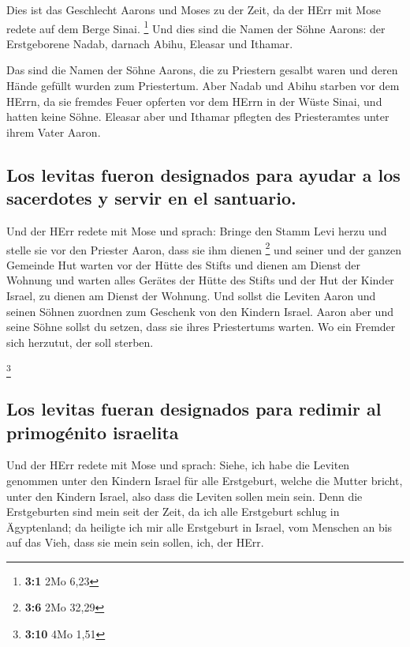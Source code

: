  Dies ist das Geschlecht Aarons und Moses zu der Zeit, da
der HErr mit Mose redete auf dem Berge Sinai. \footnote{\textbf{3:1} 2Mo
  6,23}  Und dies sind die Namen der Söhne Aarons: der
Erstgeborene Nadab, darnach Abihu, Eleasar und Ithamar.

 Das sind die Namen der Söhne Aarons, die zu Priestern
gesalbt waren und deren Hände gefüllt wurden zum Priestertum.
 Aber Nadab und Abihu starben vor dem HErrn, da sie
fremdes Feuer opferten vor dem HErrn in der Wüste Sinai, und hatten
keine Söhne. Eleasar aber und Ithamar pflegten des Priesteramtes unter
ihrem Vater Aaron.

\hypertarget{los-levitas-fueron-designados-para-ayudar-a-los-sacerdotes-y-servir-en-el-santuario.}{%
\subsection{Los levitas fueron designados para ayudar a los sacerdotes y
servir en el
santuario.}\label{los-levitas-fueron-designados-para-ayudar-a-los-sacerdotes-y-servir-en-el-santuario.}}

 Und der HErr redete mit Mose und sprach: 
Bringe den Stamm Levi herzu und stelle sie vor den Priester Aaron, dass
sie ihm dienen \footnote{\textbf{3:6} 2Mo 32,29}  und
seiner und der ganzen Gemeinde Hut warten vor der Hütte des Stifts und
dienen am Dienst der Wohnung  und warten alles Gerätes der
Hütte des Stifts und der Hut der Kinder Israel, zu dienen am Dienst der
Wohnung.  Und sollst die Leviten Aaron und seinen Söhnen
zuordnen zum Geschenk von den Kindern Israel.  Aaron aber
und seine Söhne sollst du setzen, dass sie ihres Priestertums warten. Wo
ein Fremder sich herzutut, der soll sterben.

\footnote{\textbf{3:10} 4Mo 1,51}

\hypertarget{los-levitas-fueran-designados-para-redimir-al-primoguxe9nito-israelita}{%
\subsection{Los levitas fueran designados para redimir al primogénito
israelita}\label{los-levitas-fueran-designados-para-redimir-al-primoguxe9nito-israelita}}

 Und der HErr redete mit Mose und sprach: 
Siehe, ich habe die Leviten genommen unter den Kindern Israel für alle
Erstgeburt, welche die Mutter bricht, unter den Kindern Israel, also
dass die Leviten sollen mein sein.  Denn die Erstgeburten
sind mein seit der Zeit, da ich alle Erstgeburt schlug in Ägyptenland;
da heiligte ich mir alle Erstgeburt in Israel, vom Menschen an bis auf
das Vieh, dass sie mein sein sollen, ich, der HErr.

